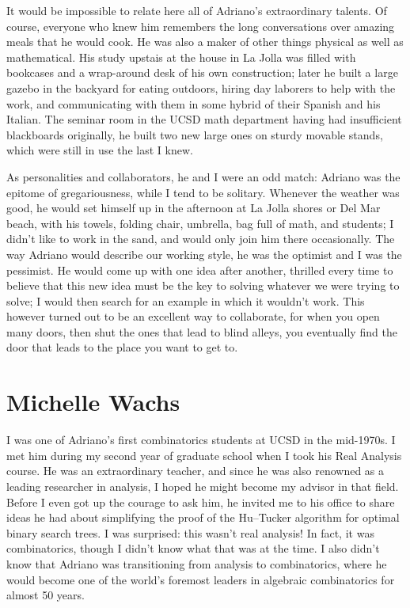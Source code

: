 \documentclass{notices}
\begin{document}
It would be impossible to relate here all of Adriano's extraordinary talents.  Of course, everyone who knew him remembers the long conversations over amazing meals that he would cook.  He was also a maker of other things physical as well as mathematical.  His study upstais at the house in La Jolla was filled with bookcases and a wrap-around desk of his own construction; later he built a large gazebo in the backyard for eating outdoors, hiring day laborers to help with the work, and communicating with them in some hybrid of their Spanish and his Italian.  The seminar room in the UCSD math department having had insufficient blackboards originally, he built two new large ones on sturdy movable stands, which were still in use the last I knew.

As personalities and collaborators, he and I were an odd match: Adriano was the epitome of gregariousness, while I tend to be solitary.  Whenever the weather was good, he would set himself up in the afternoon at La Jolla shores or Del Mar beach, with his towels, folding chair, umbrella, bag full of math, and students; I didn't like to work in the sand, and would only join him there occasionally.  The way Adriano would describe our working style, he was the optimist and I was the pessimist.  He would come up with one idea after another, thrilled every time to believe that this new idea must be the key to solving whatever we were trying to solve; I would then search for an example in which it wouldn't work.  This however turned out to be an excellent way to collaborate, for when you open many doors, then shut the ones that lead to blind alleys, you eventually find the door that leads to the place you want to get to.

\section*{Michelle Wachs}
I was one of Adriano’s first combinatorics students at UCSD in the mid-1970s. I met him during my second year of graduate school when I took his Real Analysis course. He was an extraordinary teacher, and since he was also renowned as a leading researcher in analysis, I hoped he might become my advisor in that field.  Before I even got up the courage to ask him, he invited me to his office to share  ideas he had about simplifying the proof of the 
Hu--Tucker algorithm for optimal binary search trees. I was surprised: this wasn’t real analysis! In fact, it was combinatorics, though I didn’t know what that was at the time. I also didn’t know that Adriano was transitioning from analysis to combinatorics, where he would become one of the world's foremost leaders in algebraic combinatorics for almost 50 years.
\end{document}
